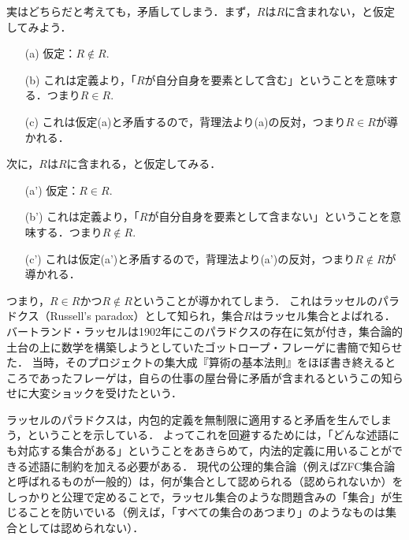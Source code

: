 \documentclass[11pt,a4paper]{jsarticle}
\begin{document}
実はどちらだと考えても，矛盾してしまう．まず，$R$は$R$に含まれない，と仮定してみよう．
\begin{itemize}
 \item[(a)] 仮定：$R \not\in R$.
 \item[(b)] これは定義より，「$R$が自分自身を要素として含む」ということを意味する．つまり$R \in R$.
 \item[(c)] これは仮定(a)と矛盾するので，背理法より(a)の反対，つまり$R \in R$が導かれる．
\end{itemize}
次に，$R$は$R$に含まれる，と仮定してみる．
\begin{itemize}
 \item[(a')] 仮定：$R \in R$.
 \item[(b')] これは定義より，「$R$が自分自身を要素として含まない」ということを意味する．つまり$R \not\in R$.
 \item[(c')] これは仮定(a')と矛盾するので，背理法より(a')の反対，つまり$R \not\in R$が導かれる．
\end{itemize}
つまり，$R \in R$かつ$R \not\in R$ということが導かれてしまう．
これはラッセルのパラドクス（Russell's paradox）として知られ，集合$R$はラッセル集合とよばれる．
バートランド・ラッセルは1902年にこのパラドクスの存在に気が付き，集合論的土台の上に数学を構築しようとしていたゴットロープ・フレーゲに書簡で知らせた．
当時，そのプロジェクトの集大成『算術の基本法則』をほぼ書き終えるところであったフレーゲは，自らの仕事の屋台骨に矛盾が含まれるというこの知らせに大変ショックを受けたという．

ラッセルのパラドクスは，内包的定義を無制限に適用すると矛盾を生んでしまう，ということを示している．
よってこれを回避するためには，「どんな述語にも対応する集合がある」ということをあきらめて，内法的定義に用いることができる述語に制約を加える必要がある．
現代の公理的集合論（例えばZFC集合論と呼ばれるものが一般的）は，何が集合として認められる（認められないか）をしっかりと公理で定めることで，ラッセル集合のような問題含みの「集合」が生じることを防いでいる（例えば，「すべての集合のあつまり」のようなものは集合としては認められない）．




%
\end{document}
